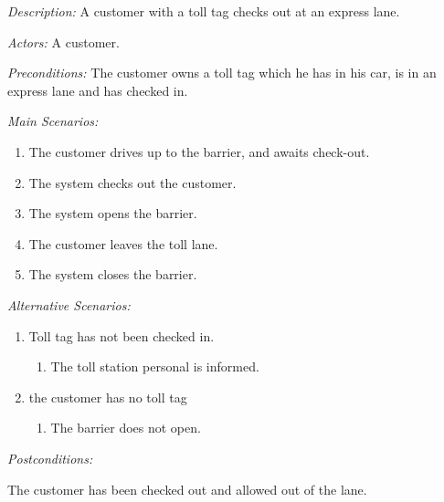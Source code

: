 \textit{Description:}
A customer with a toll tag checks out at an express lane.


\textit{Actors:}
A customer.


\textit{Preconditions:}
The customer owns a toll tag which he has in his car, is in an express
lane and has checked in.


\textit{Main Scenarios:}
\begin{enumerate}
\item The customer drives up to the barrier, and awaits check-out.
\item The system checks out the customer.
\item The system opens the barrier.
\item The customer leaves the toll lane.
\item The system closes the barrier.
\end{enumerate}

\textit{Alternative Scenarios:}
\begin{enumerate}
\item Toll tag has not been checked in.

\begin{enumerate}
\item The toll station personal is informed.
\end{enumerate}
\item the customer has no toll tag

\begin{enumerate}
\item The barrier does not open.
\end{enumerate}
\end{enumerate}

\textit{Postconditions:}

The customer has been checked out and allowed out of the lane.

